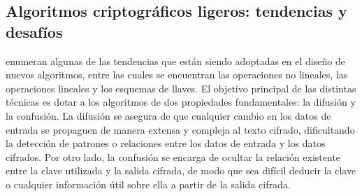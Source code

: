 \documentclass[a4paper,10pt]{article}
\begin{document}
	\subsection{Algoritmos criptográficos ligeros: tendencias y desafíos}
	\label{sec.2.1}
	\textcite{biryukov2017state} enumeran algunas de las tendencias que están siendo adoptadas en el diseño de nuevos algoritmos, entre las cuales se encuentran las operaciones no lineales, las operaciones lineales y los esquemas de llaves. El objetivo principal de las distintas técnicas es dotar a los algoritmos de dos propiedades fundamentales: la difusión y la confusión. La difusión se asegura de que cualquier cambio en los datos de entrada se propaguen de manera extensa y compleja al texto cifrado, dificultando la detección de patrones o relaciones entre los datos de entrada y los datos cifrados. Por otro lado, la confusión se encarga de ocultar la relación existente entre la clave utilizada y la salida cifrada, de modo que sea difícil deducir la clave o cualquier información útil sobre ella a partir de la salida cifrada.
	
\end{document}
